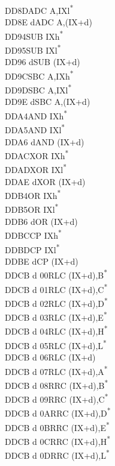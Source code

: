 \documentclass[twoside,openright,a4paper]{book}
\begin{document}
\begin{multicols}{3}
{\begin{tabbing}
	DD8D\>ADC A,IXl\textsuperscript{*}\\
	DD8E d\>ADC A,(IX+d)\\
	DD94\>SUB IXh\textsuperscript{*}\\
	DD95\>SUB IXl\textsuperscript{*}\\
	DD96 d\>SUB (IX+d)\\
	DD9C\>SBC A,IXh\textsuperscript{*}\\
	DD9D\>SBC A,IXl\textsuperscript{*}\\
	DD9E d\>SBC A,(IX+d)\\
	DDA4\>AND IXh\textsuperscript{*}\\
	DDA5\>AND IXl\textsuperscript{*}\\
	DDA6 d\>AND (IX+d)\\
	DDAC\>XOR IXh\textsuperscript{*}\\
	DDAD\>XOR IXl\textsuperscript{*}\\
	DDAE d\>XOR (IX+d)\\
	DDB4\>OR IXh\textsuperscript{*}\\
	DDB5\>OR IXl\textsuperscript{*}\\
	DDB6 d\>OR (IX+d)\\
	DDBC\>CP IXh\textsuperscript{*}\\
	DDBD\>CP IXl\textsuperscript{*}\\
	DDBE d\>CP (IX+d)\\
	DDCB d 00\>RLC (IX+d),B\textsuperscript{*}\\
	DDCB d 01\>RLC (IX+d),C\textsuperscript{*}\\
	DDCB d 02\>RLC (IX+d),D\textsuperscript{*}\\
	DDCB d 03\>RLC (IX+d),E\textsuperscript{*}\\
	DDCB d 04\>RLC (IX+d),H\textsuperscript{*}\\
	DDCB d 05\>RLC (IX+d),L\textsuperscript{*}\\
	DDCB d 06\>RLC (IX+d)\\
	DDCB d 07\>RLC (IX+d),A\textsuperscript{*}\\
	DDCB d 08\>RRC (IX+d),B\textsuperscript{*}\\
	DDCB d 09\>RRC (IX+d),C\textsuperscript{*}\\
	DDCB d 0A\>RRC (IX+d),D\textsuperscript{*}\\
	DDCB d 0B\>RRC (IX+d),E\textsuperscript{*}\\
	DDCB d 0C\>RRC (IX+d),H\textsuperscript{*}\\
	DDCB d 0D\>RRC (IX+d),L\textsuperscript{*}\\

\end{tabbing}}
\end{multicols}
\end{document}
